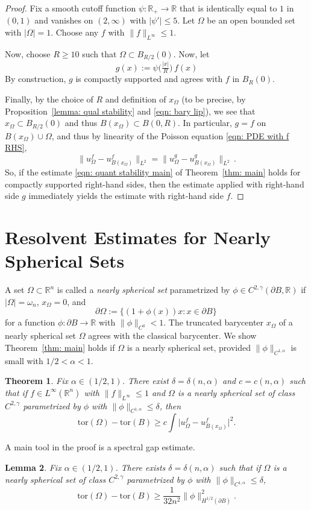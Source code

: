 \documentclass[10pt, reqno]{amsart}
\numberwithin{equation}{section}
\newtheorem{theorem}{Theorem}[section]
\newtheorem{lemma}[theorem]{Lemma}
\def\R{{\mathbb R}}
\def\W{\Omega}
\def\om{\omega}
\def\tor{\mathrm{tor}}
\begin{document}
 \begin{proof}
 Fix a smooth cutoff function $\psi:\R_+\to \R$ that is identically equal to $1$ in $(0,1)$ and vanishes on $(2,\infty)$ with $|\psi'|\leq 5$. 
Let $\W$ be an open bounded set with $|\W| = 1$.
  Choose any $f$ with $\| f\|_{L^{\infty}} \leq 1$.   
  
  Now, choose $R\geq 10$ such that $\W \subset B_{R/2}(0)$. Now, let 
 \[
{g(x)  := \psi\Big(\tfrac{|x|}{R}\Big) \,f(x)}
 \]
 By construction, $g$ is compactly supported and agrees with {$f$} in $B_R(0)$.
 
 Finally, by the choice of $R$ and definition of $x_\W$ (to be precise, by Proposition~\ref{lemma: qual stability} and \eqref{eqn: bary lip}), we see that $x_\W \subset B_{R/2}(0)$ and thus $B(x_{{\W}}) \subset B(0, R)$. 
 In particular, $g=f$ on $B({x_\W})\cup \W$, and thus by linearity of the Poisson equation \eqref{eqn: PDE with f RHS}, 
 \[
 \big\| u_\W^f - u_{B(x_\W)}^f \big\|_{L^2} =  \big\| u_\W^g - u_{B(x_\W)}^g \big\|_{L^2}\,.
 \]
 So, if the estimate \eqref{eqn: quant stability main} of Theorem~\ref{thm: main} holds for compactly supported right-hand sides, then the estimate applied with right-hand side $g$ immediately yields the estimate with right-hand side $f$. 
 \end{proof}



%
\section{Resolvent Estimates for Nearly Spherical Sets}\label{sec: linear stability}
A set $\Omega\subset \R^n$ is called a {\it nearly spherical set} parametrized by $\phi \in C^{2,\gamma}(\partial B, \mathbb{R})$
 if $|\W|=\om_n$,  $x_\W =0$, and 
\[
\partial \Omega :=  \{ (1+\phi(x))x :  x \in \partial B\}\,
\]
for a function $\phi : \partial B\to \R$ with $\|\phi\|_{C^0}< 1.$ The truncated barycenter $x_\W$ of a nearly spherical set $\W$ agrees with the classical barycenter. We show Theorem~\ref{thm: main} holds if $\W$ is a nearly spherical set, provided $\|\phi\|_{C^{1,\alpha}}$ is small with $1/2< \alpha < 1$.
\begin{theorem}\label{cor: Fuglede}
	Fix {$\alpha \in (1/2,1)$}. There exist $\delta = \delta(n,\alpha)$  and $c=c(n,\alpha)$ such that if $f \in L^\infty(\R^n)$ with $\|f \|_{L^\infty}\leq 1$ and  $\W$ is a nearly spherical set of class $C^{2,\gamma}$ parametrized by $\phi$ with $\| \phi\|_{C^{1,\alpha}} \leq \delta$, then
\[
\tor(\W) - \tor(B) \geq c \int \big| u_\W^f - u_{B({x_\W})}^f\big|^2.  
\]
\end{theorem}  
A main tool in the proof is a spectral gap estimate.   
\begin{lemma} \label{thm: spectral gap}
Fix  $\alpha \in (1/2,1)$. There exists $\delta = \delta(n,\alpha)$ such that if $\W$ is a nearly spherical set of class $C^{2,\gamma}$ parametrized by $\phi$ with {$\| \phi\|_{C^{1,\alpha}} \leq \delta$}, 
\[
\tor(\W) - \tor(B) \geq \frac{1}{32n^2} \| \phi \|_{H^{1/2}(\partial B)}^2. 
\]
\end{lemma}
\end{document}
